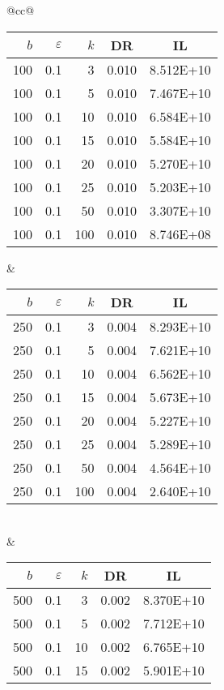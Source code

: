 \begin{table}[H]
	\centering
	\begin{tabular}{@{}cc@{}}
		\begin{tabular}{@{}rrrrr@{}}
			\toprule
			$b$ & $\varepsilon$ & $k$ & \multicolumn{1}{c}{DR} & \multicolumn{1}{c}{IL} \\ \midrule
			100	&	0.1	&	3	&	0.010	&	8.512E+10 \\
			100	&	0.1	&	5	&	0.010	&	7.467E+10 \\
			100	&	0.1	&	10	&	0.010	&	6.584E+10 \\
			100	&	0.1	&	15	&	0.010	&	5.584E+10 \\
			100	&	0.1	&	20	&	0.010	&	5.270E+10 \\
			100	&	0.1	&	25	&	0.010	&	5.203E+10 \\
			100	&	0.1	&	50	&	0.010	&	3.307E+10 \\
			100	&	0.1	&	100	&	0.010	&	8.746E+08 \\
		\end{tabular}
		&
		\begin{tabular}{@{}rrrrr@{}}
			\toprule
			$b$ & $\varepsilon$ & $k$ & \multicolumn{1}{c}{DR} & \multicolumn{1}{c}{IL} \\ \midrule
			250	&	0.1	&	3	&	0.004	&	8.293E+10 \\
			250	&	0.1	&	5	&	0.004	&	7.621E+10 \\
			250	&	0.1	&	10	&	0.004	&	6.562E+10 \\
			250	&	0.1	&	15	&	0.004	&	5.673E+10 \\
			250	&	0.1	&	20	&	0.004	&	5.227E+10 \\
			250	&	0.1	&	25	&	0.004	&	5.289E+10 \\
			250	&	0.1	&	50	&	0.004	&	4.564E+10 \\
			250	&	0.1	&	100	&	0.004	&	2.640E+10 \\
		\end{tabular}
		\\ & \\
		\begin{tabular}{@{}rrrrr@{}}
			\toprule
			$b$ & $\varepsilon$ & $k$ & \multicolumn{1}{c}{DR} & \multicolumn{1}{c}{IL} \\ \midrule
			500	&	0.1	&	3	&	0.002	&	8.370E+10 \\
			500	&	0.1	&	5	&	0.002	&	7.712E+10 \\
			500	&	0.1	&	10	&	0.002	&	6.765E+10 \\
			500	&	0.1	&	15	&	0.002	&	5.901E+10 \\

\end{tabular}
\end{tabular}
\end{table}
